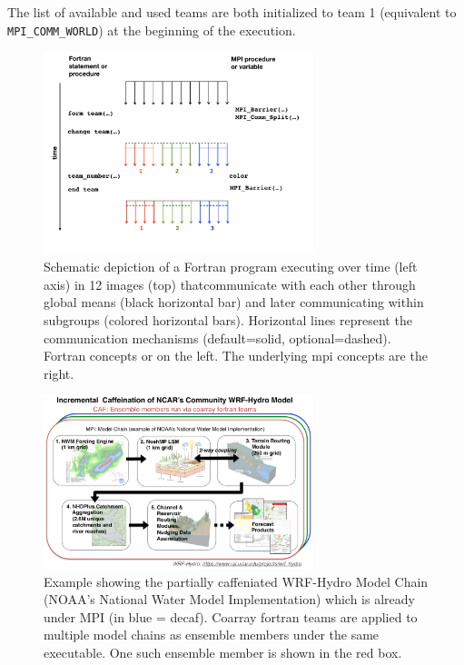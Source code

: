 The list of available and used teams are both initialized to team 1 (equivalent to \texttt{MPI\_COMM\_WORLD}) at the beginning of the execution.

\begin{figure}
\includegraphics[width=0.7\textwidth]{figures/teams}
\vspace{-36pt}
\caption{Schematic depiction of a Fortran program executing over time (left axis) in 12 images (top) thatcommunicate with each other through global means (black horizontal bar) and later communicating within subgroups (colored horizontal bars).  Horizontal lines represent the communication mechanisms (default=solid, optional=dashed).  Fortran concepts or on the left.  The underlying \gls{mpi} concepts are the right.}
\end{figure}
%

\begin{figure}
\includegraphics[width=0.7\textwidth]{figures/WRF-Hydro-caf-ens-model_chain.png}
\vspace{-7pt}
\caption{Example showing the partially caffeniated WRF-Hydro Model Chain (NOAA's National Water
  Model Implementation) which is already under MPI (in blue = decaf). Coarray
  fortran teams are applied to multiple model chains as ensemble members under the same
  executable. One such ensemble member is shown in the red box.}
\end{figure}
%

